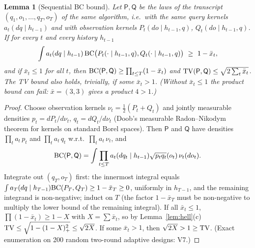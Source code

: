 \documentclass[11pt,a4paper]{article}
\numberwithin{equation}{section}
\newtheorem{lemma}[theorem]{Lemma}
\theoremstyle{definition}
\theoremstyle{remark}
\begin{document}
\begin{lemma}[Sequential BC bound]\label{lem:seq}
Let $\mathsf P,\mathsf Q$ be the laws of the transcript $(q_1,o_1,\dots,q_T,o_T)$ of the same algorithm, i.e.\ with the same query kernels $a_t(dq\mid h_{t-1})$ and with observation kernels $P_t(do\mid h_{t-1},q)$, $Q_t(do\mid h_{t-1},q)$. If for every $t$ and every history $h_{t-1}$
\[
\int a_t(dq\mid h_{t-1})\,\mathrm{BC}\big(P_t(\cdot\mid h_{t-1},q),Q_t(\cdot\mid h_{t-1},q)\big)\ \ge\ 1-\bar x_t,
\]
and if $\bar x_t\le1$ for all $t$, then $\mathrm{BC}(\mathsf P,\mathsf Q)\ge\prod_{t\le T}(1-\bar x_t)$ and $\mathrm{TV}(\mathsf P,\mathsf Q)\le\sqrt{2\sum_t\bar x_t}$. The TV bound also holds, trivially, if some $\bar x_t>1$. (Without $\bar x_t\le1$ the product bound can fail: $\bar x=(3,3)$ gives a product $4>1$.)
\end{lemma}
\begin{proof}
Choose observation kernels $\nu_t=\frac12(P_t+Q_t)$ and jointly measurable densities $p_t=dP_t/d\nu_t$, $q_t=dQ_t/d\nu_t$ (Doob's measurable Radon--Nikodym theorem for kernels on standard Borel spaces). Then $\mathsf P$ and $\mathsf Q$ have densities $\prod_ta_t\,p_t$ and $\prod_ta_t\,q_t$ w.r.t.\ $\prod_ta_t\,\nu_t$, and
\[\mathrm{BC}(\mathsf P,\mathsf Q)=\int\prod_{t\le T}a_t(dq_t\mid h_{t-1})\sqrt{p_tq_t}(o_t)\,\nu_t(do_t).\]
Integrate out $(q_T,o_T)$ first: the innermost integral equals $\int a_T(dq\mid h_{T-1})\mathrm{BC}(P_T,Q_T)\ge1-\bar x_T\ge0$, uniformly in $h_{T-1}$, and the remaining integrand is non-negative; induct on $T$ (the factor $1-\bar x_T$ must be non-negative to multiply the lower bound of the remaining integral). If all $\bar x_t\le1$, $\prod(1-\bar x_t)\ge1-X$ with $X=\sum\bar x_t$, so by Lemma~\ref{lem:hell}(c) $\mathrm{TV}\le\sqrt{1-(1-X)_+^2}\le\sqrt{2X}$. If some $\bar x_t>1$, then $\sqrt{2X}>1\ge\mathrm{TV}$. (Exact enumeration on 200 random two-round adaptive designs: V7.)
\end{proof}
\end{document}
